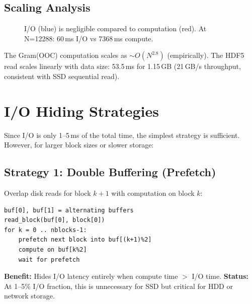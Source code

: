 \documentclass[11pt,a4paper]{article}
\begin{document}
\subsection{Scaling Analysis}

\begin{figure}[h]
\centering
{}
\caption{I/O (blue) is negligible compared to computation (red). At N=12288: 60\,ms I/O vs 7368\,ms compute.}
\end{figure}

The Gram(OOC) computation scales as $\sim O(N^{2.8})$ (empirically). The HDF5 read scales linearly with data size: 53.5\,ms for 1.15\,GB (21\,GB/s throughput, consistent with SSD sequential read).

\section{I/O Hiding Strategies}

Since I/O is only 1--5\,ms of the total time, the simplest strategy is sufficient. However, for larger block sizes or slower storage:

\subsection{Strategy 1: Double Buffering (Prefetch)}
Overlap disk reads for block $k+1$ with computation on block $k$:
\begin{verbatim}
buf[0], buf[1] = alternating buffers
read_block(buf[0], block[0])
for k = 0 .. nblocks-1:
    prefetch next block into buf[(k+1)%2]
    compute on buf[k%2]
    wait for prefetch
\end{verbatim}
\textbf{Benefit:} Hides I/O latency entirely when compute time $>$ I/O time.
\textbf{Status:} At 1--5\% I/O fraction, this is unnecessary for SSD but critical for HDD or network storage.
\end{document}
